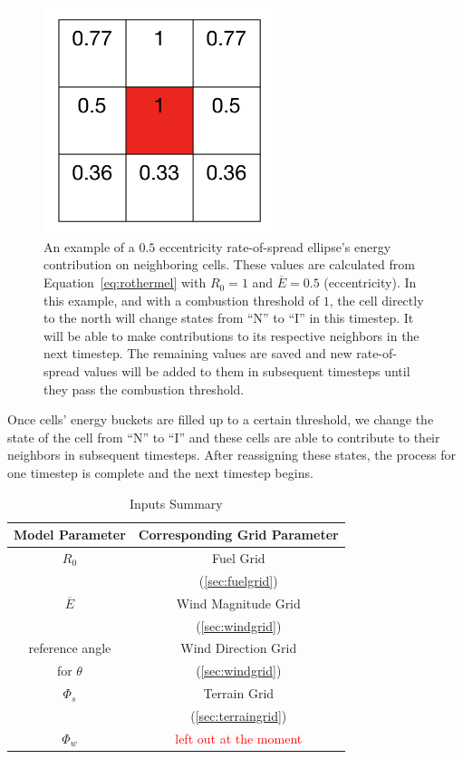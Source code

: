 \documentclass{article}
\newcommand{\note}[1]{\textcolor{red}{#1}}
\begin{document}
\begin{figure}
\centering
\includegraphics[width=0.6\textwidth]{figures/fire_bucket_ex.png}
\caption{An example of a $0.5$ eccentricity rate-of-spread ellipse's energy contribution on neighboring cells. These values are calculated from Equation~\ref{eq:rothermel} with $R_0 = 1$ and $\overline{E} = 0.5$ (eccentricity). In this example, and with a combustion threshold of $1$, the cell directly to the north will change states from ``N'' to ``I'' in this timestep. It will be able to make contributions to its respective neighbors in the next timestep. The remaining values are saved and new rate-of-spread values will be added to them in subsequent timesteps until they pass the combustion threshold.\label{fig:buckets}}
\end{figure}

Once cells' energy buckets are filled up to a certain threshold, we change the state of the cell from ``N'' to ``I'' and these cells are able to contribute to their neighbors in subsequent timesteps. After reassigning these states, the process for one timestep is complete and the next timestep begins. 



\begin{table}[h]
\caption{Inputs Summary\label{tab:inputsummary}}
\centering
\begin{tabular}{ |c|c| } 

 \hline
 Model Parameter & Corresponding Grid Parameter \\ 
 \hline
 $R_0$ &  Fuel Grid \\ 
 		         &(\ref{sec:fuelgrid}) \\
 \hline
 $\overline{E}$ &  Wind Magnitude Grid \\ 
 				                     & (\ref{sec:windgrid}) \\
 \hline
 reference angle & Wind Direction Grid \\
 for $\theta$   & (\ref{sec:windgrid}) \\
 \hline
 $\Phi_s$ & Terrain Grid \\
                & (\ref{sec:terraingrid}) \\
  \hline
  $\Phi_w$ & \note{left out at the moment} \\
  \hline
                
  
\end{tabular}


\end{table}
\end{document}

